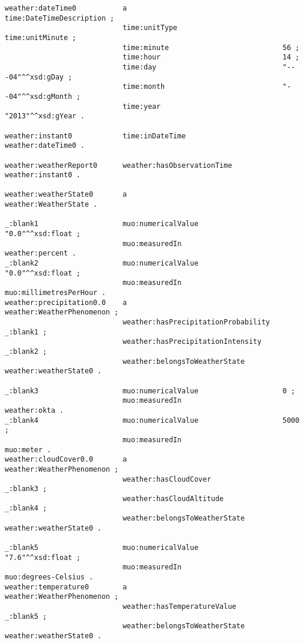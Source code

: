 \begin{lstlisting}
weather:dateTime0           a                                     time:DateTimeDescription ;
                            time:unitType                         time:unitMinute ;
                            time:minute                           56 ;
                            time:hour                             14 ;
                            time:day                              "---04"^^xsd:gDay ;
                            time:month                            "--04"^^xsd:gMonth ;
                            time:year                             "2013"^^xsd:gYear .

weather:instant0            time:inDateTime                       weather:dateTime0 .

weather:weatherReport0      weather:hasObservationTime            weather:instant0 .

weather:weatherState0       a                                     weather:WeatherState .

_:blank1                    muo:numericalValue                    "0.0"^^xsd:float ;
                            muo:measuredIn                        weather:percent .
_:blank2                    muo:numericalValue                    "0.0"^^xsd:float ;
                            muo:measuredIn                        muo:millimetresPerHour .
weather:precipitation0.0    a                                     weather:WeatherPhenomenon ;
                            weather:hasPrecipitationProbability   _:blank1 ;
                            weather:hasPrecipitationIntensity     _:blank2 ;
                            weather:belongsToWeatherState         weather:weatherState0 .

_:blank3                    muo:numericalValue                    0 ;
                            muo:measuredIn                        weather:okta .
_:blank4                    muo:numericalValue                    5000 ;
                            muo:measuredIn                        muo:meter .
weather:cloudCover0.0       a                                     weather:WeatherPhenomenon ;
                            weather:hasCloudCover                 _:blank3 ;
                            weather:hasCloudAltitude              _:blank4 ;
                            weather:belongsToWeatherState         weather:weatherState0 .

_:blank5                    muo:numericalValue                    "7.6"^^xsd:float ;
                            muo:measuredIn                        muo:degrees-Celsius .
weather:temperature0        a                                     weather:WeatherPhenomenon ;
                            weather:hasTemperatureValue           _:blank5 ;
                            weather:belongsToWeatherState         weather:weatherState0 .


\end{lstlisting}
